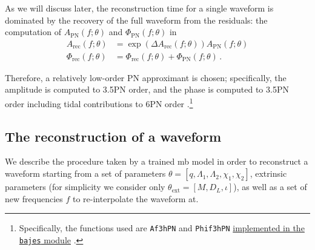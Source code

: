 \documentclass[main.tex]{subfiles}
\begin{document}
As we will discuss later, the reconstruction time for a single waveform 
is dominated by the recovery of the full waveform from the residuals: the computation of \(A _{\text{PN}}(f; \theta )\) and \(\Phi _{\text{PN}}(f; \theta )\) in
%
\begin{align}\label{eq:amplitude-phase-reconstruction}
A _{\text{rec}} (f; \theta ) &= \exp( \Delta A _{\text{rec}} (f; \theta )) A _{\text{PN}}(f; \theta )  \\
\Phi _{\text{rec}} (f; \theta ) &= \Phi _{\text{rec}}(f; \theta ) + \Phi _{\text{PN}}(f; \theta )
\,.
\end{align}

Therefore, a relatively low-order \ac{PN} approximant is chosen; specifically, the amplitude is computed to 3.5PN order, and the phase is computed to 3.5PN order including tidal contributions to 6PN order \cite{favataSystematicParameterErrors2014}.\footnote{Specifically, the functions used are \texttt{Af3hPN} and \texttt{Phif3hPN} \href{https://github.com/matteobreschi/bajes/blob/stable/v0.1/bajes/obs/gw/approx/taylorf2.py}{implemented in the \texttt{bajes} module} \cite[]{breschiTtBajesBayesian2021}.}

\subsection{The reconstruction of a waveform}

We describe the procedure taken by a trained \ac{mb} model in order to reconstruct a waveform starting from a set of parameters \(\theta = [q, \Lambda_1 , \Lambda_2 , \chi_1 , \chi_2 ]\), extrinsic parameters (for simplicity we consider only \(\theta _{\text{ext}} = [M, D_L, \iota]\)), as well as a set of new frequencies \(f\) to re-interpolate the waveform at.
\end{document}

